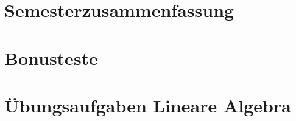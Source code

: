 \documentclass[11pt, oneside]{report}
\begin{document}


	

	\clearpage

	\thispagestyle{empty}

	
	

	\tableofcontents

	\clearpage


	\part{Semesterzusammenfassung}
	
	
	
	
	
	
	
	
	
	
	
	
	
	
	
	

	
	
	

	\part{Bonusteste}
	
	
	
	
	
	
	
	
	

	\part{Übungsaufgaben Lineare Algebra}
	
	
	
	
	
	
	
	
\end{document}
